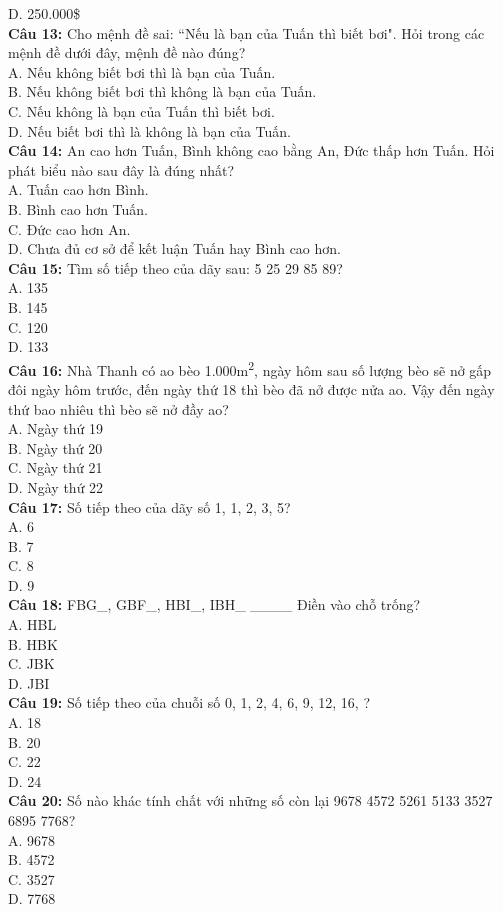 \begin{multicols}{2}
D. 250.000\$ \\
\textbf{Câu 13:} Cho mệnh đề sai: ``Nếu là bạn của Tuấn thì biết bơi". Hỏi trong các mệnh đề dưới đây, mệnh đề nào đúng? \\
A. Nếu không biết bơi thì là bạn của Tuấn. \\
B. Nếu không biết bơi thì không là bạn của Tuấn. \\
C. Nếu không là bạn của Tuấn thì biết bơi. \\
D. Nếu biết bơi thì là không là bạn của Tuấn. \\
\textbf{Câu 14:} An cao hơn Tuấn, Bình không cao bằng An, Đức thấp hơn Tuấn. Hỏi phát biểu nào sau đây là đúng nhất? \\
A. Tuấn cao hơn Bình. \\
B. Bình cao hơn Tuấn. \\
C. Đức cao hơn An. \\
D. Chưa đủ cơ sở để kết luận Tuấn hay Bình cao hơn. \\
\textbf{Câu 15:} Tìm số tiếp theo của dãy sau: 5 25 29 85 89? \\
A. 135 \\
B. 145 \\
C. 120 \\
D. 133 \\
\textbf{Câu 16:} Nhà Thanh có ao bèo 1.000m\textsuperscript{2}, ngày hôm sau số lượng bèo sẽ nở gấp đôi ngày hôm trước, đến ngày thứ 18 thì bèo đã nở được nửa ao. Vậy đến ngày thứ bao nhiêu thì bèo sẽ nở đầy ao? \\
A. Ngày thứ 19 \\
B. Ngày thứ 20 \\
C. Ngày thứ 21 \\
D. Ngày thứ 22 \\
\textbf{Câu 17:} Số tiếp theo của dãy số 1, 1, 2, 3, 5? \\
A. 6 \\
B. 7 \\
C. 8 \\
D. 9 \\
\textbf{Câu 18:} FBG\_, GBF\_, HBI\_, IBH\_ \_\_\_\_ Điền vào chỗ trống? \\
A. HBL \\
B. HBK \\
C. JBK \\
D. JBI \\
\textbf{Câu 19:} Số tiếp theo của chuỗi số 0, 1, 2, 4, 6, 9, 12, 16, ? \\
A. 18 \\
B. 20 \\
C. 22 \\
D. 24 \\
\textbf{Câu 20:} Số nào khác tính chất với những số còn lại 9678 4572 5261 5133 3527 6895 7768? \\
A. 9678 \\
B. 4572 \\
C. 3527 \\
D. 7768 \\

\end{multicols}

